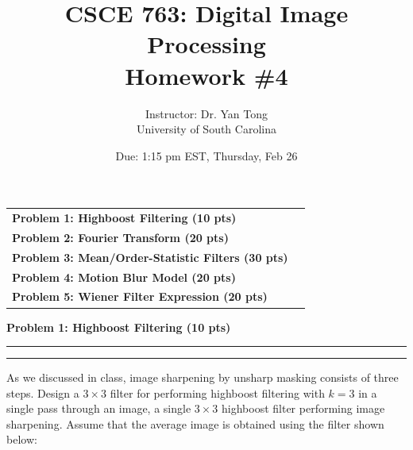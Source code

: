 \documentclass[12pt]{article}
\title{CSCE 763: Digital Image Processing \\ Homework \#4}
\author{Instructor: Dr. Yan Tong \\ University of South Carolina}
\date{Due: 1:15 pm EST, Thursday, Feb 26}
\newcommand{\question}[1]{%
  \clearpage
  \vspace{0.5cm}
  {\noindent\normalsize \textbf{#1}}
  \vspace{0.2cm}
  \hrule
  \vspace{0.1cm}
  \hrule
  \vspace{0.3cm}
}
\begin{document}
\maketitle
\setlength{\parindent}{0pt}



\begin{center}
\begin{tcolorbox}[colback=white, colframe=gray!50!black, colbacktitle=gray!20!white,
                  coltitle=black, sharp corners, boxrule=1pt,
                  title=\Large\bfseries Table of Contents]
\begin{tabular}{p{}r}
\textbf{Problem 1: Highboost Filtering (10 pts)} \dotfill & \textbf{\pageref{quest:1}} \\[0.3em]
\textbf{Problem 2: Fourier Transform (20 pts)} \dotfill & \textbf{\pageref{quest:2}} \\[0.3em]
\textbf{Problem 3: Mean/Order-Statistic Filters (30 pts)} \dotfill & \textbf{\pageref{quest:3}} \\[0.3em]
\textbf{Problem 4: Motion Blur Model (20 pts)} \dotfill & \textbf{\pageref{quest:4}} \\[0.3em]
\textbf{Problem 5: Wiener Filter Expression (20 pts)} \dotfill & \textbf{\pageref{quest:5}} \\
\end{tabular}
\vspace{0.2cm}
\end{tcolorbox}
\end{center}

\vspace{0.5cm}


\question{Problem 1: Highboost Filtering (10 pts)}\label{quest:1}

As we discussed in class, image sharpening by unsharp masking consists of three steps.
Design a $3 \times 3$ filter for performing highboost filtering with $k=3$ in a single pass through an image,
a single $3 \times 3$ highboost filter performing image sharpening. Assume that the average image is obtained
using the filter shown below:
\end{document}
